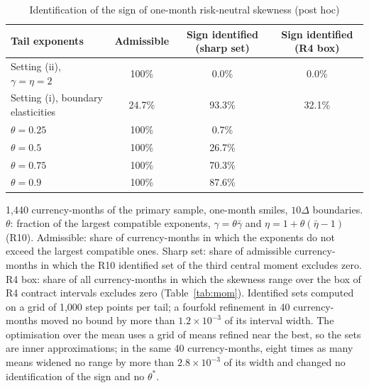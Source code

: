 \documentclass[11pt]{article}
\theoremstyle{result}
\newcommand{\D}{\Delta}
\begin{document}
\begin{table}[t]
\centering\small
\caption{Identification of the sign of one-month risk-neutral skewness (post hoc)}\label{tab:ident}
\begin{tabular}{lccc}
\toprule
Tail exponents & Admissible & Sign identified (sharp set) & Sign identified (R4 box) \\
\midrule
Setting (ii), $\gamma=\eta=2$ & 100\% & 0.0\% & 0.0\% \\
Setting (i), boundary elasticities & 24.7\% & 93.3\% & 32.1\% \\
$\theta=0.25$ & 100\% & 0.7\% & \\
$\theta=0.5$ & 100\% & 26.7\% & \\
$\theta=0.75$ & 100\% & 70.3\% & \\
$\theta=0.9$ & 100\% & 87.6\% & \\
\bottomrule
\end{tabular}
\par\medskip
\begin{minipage}{0.9\linewidth}\footnotesize
1,440 currency-months of the primary sample, one-month smiles, $10\D$ boundaries. $\theta$: fraction of the largest compatible exponents, $\gamma=\theta\bar\gamma$ and $\eta=1+\theta(\bar\eta-1)$ (R10). Admissible: share of currency-months in which the exponents do not exceed the largest compatible ones. Sharp set: share of admissible currency-months in which the R10 identified set of the third central moment excludes zero. R4 box: share of all currency-months in which the skewness range over the box of R4 contract intervals excludes zero (Table~\ref{tab:mom}). Identified sets computed on a grid of 1,000 step points per tail; a fourfold refinement in 40 currency-months moved no bound by more than $1.2\times10^{-3}$ of its interval width. The optimisation over the mean uses a grid of means refined near the best, so the sets are inner approximations; in the same 40 currency-months, eight times as many means widened no range by more than $2.8\times10^{-3}$ of its width and changed no identification of the sign and no $\theta^*$.
\end{minipage}
\end{table}
\end{document}
